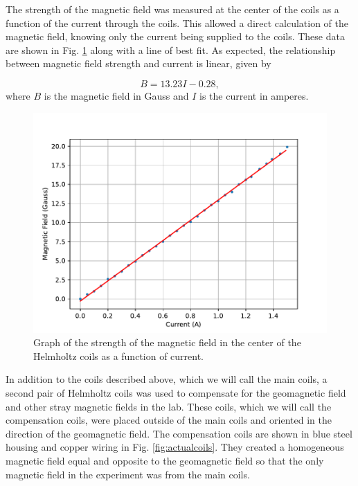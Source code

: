 The strength of the magnetic field was measured at the center of the coils as a function of the current through the coils. This allowed a direct calculation of the magnetic field, knowing only the current being supplied to the coils. These data are shown in Fig. \ref{fig:FieldvCurrent} along with a line of best fit. As expected, the relationship between magnetic field strength and current is linear, given by

\begin{equation}
	B = 13.23 I-0.28,
	\label{eq:fieldvcurrent}
\end{equation}
%
where $B$ is the magnetic field in Gauss and $I$ is the current in amperes.

\begin{figure}[h]
		\centering
		\includegraphics[width = .8\textwidth]{Images/FieldvCurrent.pdf}
		\caption{Graph of the strength of the magnetic field in the center of the Helmholtz coils as a function of current.}
		\label{fig:FieldvCurrent}
\end{figure}

In addition to the coils described above, which we will call the main coils, a second pair of Helmholtz coils was used to compensate for the geomagnetic field and other stray magnetic fields in the lab. These coils, which we will call the compensation coils, were placed outside of the main coils and oriented in the direction of the geomagnetic field. The compensation coils are shown in blue steel housing and copper wiring in Fig. \ref{fig:actualcoils}. They created a homogeneous magnetic field equal and opposite to the geomagnetic field so that the only magnetic field in the experiment was from the main coils.



